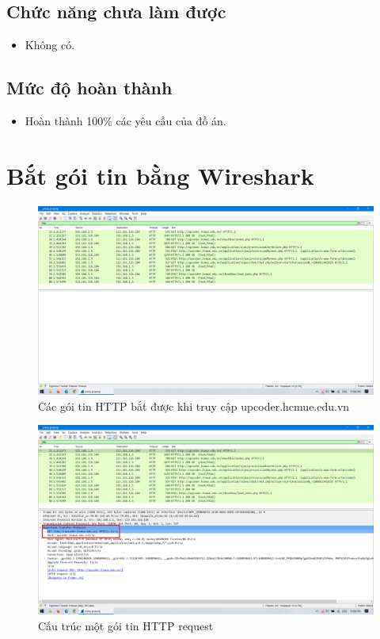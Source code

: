 \documentclass[12pt,a4paper]{article}
\begin{document}
		\subsection{Chức năng chưa làm được}
			\begin{itemize}
				\item Không có.
			\end{itemize}
		\subsection{Mức độ hoàn thành}
			\begin{itemize}
				\item Hoàn thành 100\% các yêu cầu của đồ án.
			\end{itemize}
	\section{Bắt gói tin bằng Wireshark}
		\begin{center}
			\begin{figure}[H]
				\begin{center}
					\includegraphics[scale=.25]{images/ws_packets}
				\end{center}
				\caption{Các gói tin HTTP bắt được khi truy cập upcoder.hcmue.edu.vn}
			\end{figure}
		\end{center}
		\begin{center}
			\begin{figure}[H]
				\begin{center}
					\includegraphics[scale=.335]{images/ws_request}
				\end{center}
				\caption{Cấu trúc một gói tin HTTP request}						
			\end{figure}
		\end{center}
\end{document}
